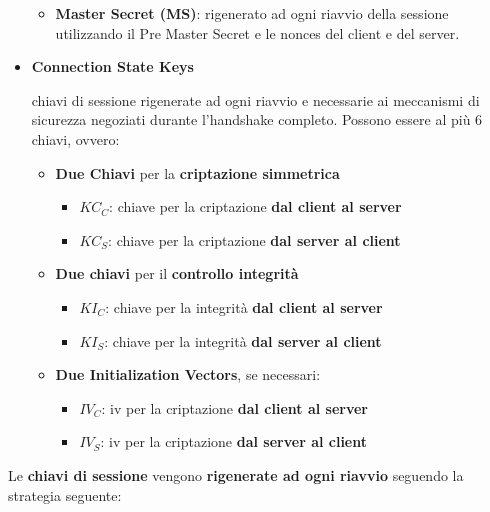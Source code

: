 \begin{itemize}
\begin{itemize}
\begin{definition}
        \end{definition}
        \item \textbf{Master Secret (MS)}: rigenerato ad ogni riavvio della sessione utilizzando il Pre Master Secret e le nonces del client e del server.
    \end{itemize}
    \item \textbf{Connection State Keys}
    \begin{definition}
    chiavi di sessione rigenerate ad ogni riavvio e necessarie ai meccanismi di sicurezza negoziati durante l’handshake completo. Possono essere al più 6 chiavi, ovvero:
    \begin{itemize}
        \item \textbf{Due Chiavi} per la \textbf{criptazione simmetrica}
        \begin{itemize}
            \item $KC_C$: chiave per la criptazione \textbf{dal client al server}
            \item $KC_S$: chiave per la criptazione \textbf{dal server al client}
        \end{itemize}
        \item \textbf{Due chiavi} per il \textbf{controllo integrità}
         \begin{itemize}
            \item $KI_C$: chiave per la integrità \textbf{dal client al server}
            \item $KI_S$: chiave per la integrità \textbf{dal server al client}
        \end{itemize}
        \item \textbf{Due Initialization Vectors}, se necessari:
        \begin{itemize}
            \item $IV_C$: iv per la criptazione \textbf{dal client al server}
            \item $IV_S$:  iv per la criptazione \textbf{dal server al client}
        \end{itemize}
    \end{itemize}
    \end{definition}
\end{itemize}
Le \textbf{chiavi di sessione} vengono \textbf{rigenerate ad ogni riavvio} seguendo la strategia seguente:
